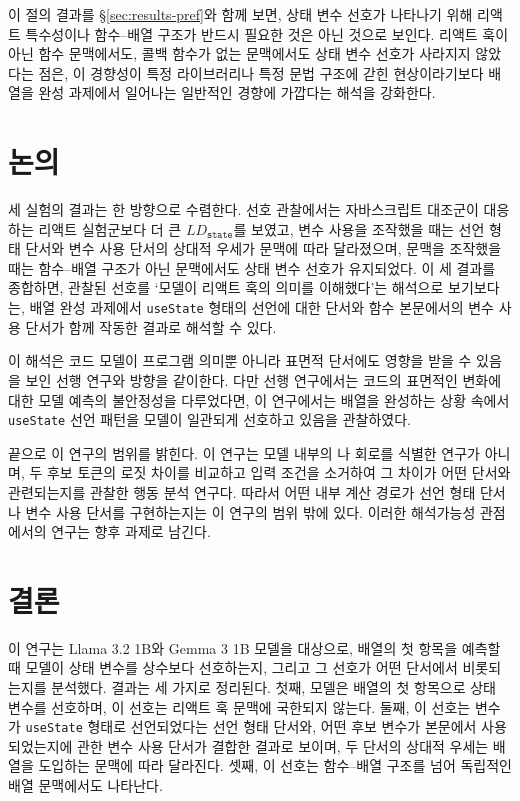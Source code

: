 \documentclass[11pt]{article}
\begin{document}
이 절의 결과를 \S\ref{sec:results-pref}와 함께 보면, 상태 변수 선호가 나타나기 위해 리액트 특수성이나 함수--배열 구조가 반드시 필요한 것은 아닌 것으로 보인다.
리액트 훅이 아닌 함수 문맥에서도, 콜백 함수가 없는 문맥에서도 상태 변수 선호가 사라지지 않았다는 점은, 이 경향성이 특정 라이브러리나 특정 문법 구조에 갇힌 현상이라기보다 배열을 완성 과제에서 일어나는 일반적인 경향에 가깝다는 해석을 강화한다.

\section{논의}
\label{sec:discussion}

세 실험의 결과는 한 방향으로 수렴한다.
선호 관찰에서는 자바스크립트 대조군이 대응하는 리액트 실험군보다 더 큰 $LD_{\texttt{state}}$를 보였고, 변수 사용을 조작했을 때는 선언 형태 단서와 변수 사용 단서의 상대적 우세가 문맥에 따라 달라졌으며, 문맥을 조작했을 때는 함수--배열 구조가 아닌 문맥에서도 상태 변수 선호가 유지되었다.
이 세 결과를 종합하면, 관찰된 선호를 `모델이 리액트 훅의 의미를 이해했다'는 해석으로 보기보다는, 배열 완성 과제에서 \texttt{useState} 형태의 선언에 대한 단서와 함수 본문에서의 변수 사용 단서가 함께 작동한 결과로 해석할 수 있다.

이 해석은 코드 모델이 프로그램 의미뿐 아니라 표면적 단서에도 영향을 받을 수 있음을 보인 선행 연구와 방향을 같이한다\citep{yefet2020adversarial,wang2024naming,orvalho2025robust}.
다만 선행 연구에서는 코드의 표면적인 변화에 대한 모델 예측의 불안정성을 다루었다면, 이 연구에서는 배열을 완성하는 상황 속에서 \texttt{useState} 선언 패턴을 모델이 일관되게 선호하고 있음을 관찰하였다.

끝으로 이 연구의 범위를 밝힌다.
이 연구는 모델 내부의 나 회로를 식별한 연구가 아니며, 두 후보 토큰의 로짓 차이를 비교하고 입력 조건을 소거하여 그 차이가 어떤 단서와 관련되는지를 관찰한 행동 분석 연구다.
따라서 어떤 내부 계산 경로가 선언 형태 단서나 변수 사용 단서를 구현하는지는 이 연구의 범위 밖에 있다.
이러한 해석가능성 관점에서의 연구는 향후 과제로 남긴다\citep{miller2025mechanistic,rodriguez2023galeras}.

\section{결론}
\label{sec:conclusion}

이 연구는 Llama 3.2 1B와 Gemma 3 1B 모델을 대상으로, 배열의 첫 항목을 예측할 때 모델이 상태 변수를 상수보다 선호하는지, 그리고 그 선호가 어떤 단서에서 비롯되는지를 분석했다.
결과는 세 가지로 정리된다.
첫째, 모델은 배열의 첫 항목으로 상태 변수를 선호하며, 이 선호는 리액트 훅 문맥에 국한되지 않는다.
둘째, 이 선호는 변수가 \texttt{useState} 형태로 선언되었다는 선언 형태 단서와, 어떤 후보 변수가 본문에서 사용되었는지에 관한 변수 사용 단서가 결합한 결과로 보이며, 두 단서의 상대적 우세는 배열을 도입하는 문맥에 따라 달라진다.
셋째, 이 선호는 함수--배열 구조를 넘어 독립적인 배열 문맥에서도 나타난다.
\end{document}
